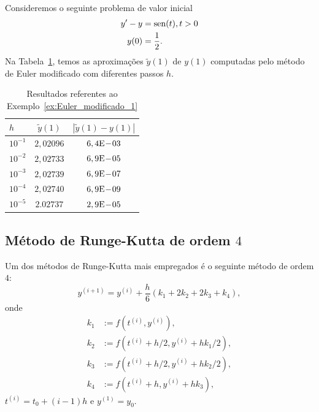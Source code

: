 \begin{ex}\label{ex:Euler_modificado_1}
  Consideremos o seguinte problema de valor inicial
  \begin{align}
    y' - y &= \operatorname{sen}(t), t>0\\
    y(0) &= \frac{1}{2}.
  \end{align}
  Na Tabela~\ref{tab:ex_Euler_modificado_1}, temos as aproximações $\tilde{y}(1)$ de $y(1)$ computadas pelo método de Euler modificado com diferentes passos $h$.
 
  \begin{table}[h!]
    \centering
    \begin{tabular}{l|cc}
      $h$ & $\tilde{y}(1)$ & $|\tilde{y}(1)-y(1)|$\\\hline
      $10^{-1}$ & $2,02096$ & $6,4\mathrm{E}\!-\!03$ \\
      $10^{-2}$ & $2,02733$ & $6,9\mathrm{E}\!-\!05$ \\
      $10^{-3}$ & $2,02739$ & $6,9\mathrm{E}\!-\!07$ \\
      $10^{-4}$ & $2,02740$ & $6,9\mathrm{E}\!-\!09$ \\
      $10^{-5}$ & $2.02737$ & $2,9\mathrm{E}\!-\!05$ \\\hline
    \end{tabular}
    \caption{Resultados referentes ao Exemplo~\ref{ex:Euler_modificado_1}}
    \label{tab:ex_Euler_modificado_1}
  \end{table}





\end{ex}

\subsection{Método de Runge-Kutta de ordem $4$}

Um dos métodos de Runge-Kutta mais empregados é o seguinte método de ordem $4$:
\begin{equation}
  y^{(i+1)} = y^{(i)} + \frac{h}{6}(k_1 + 2k_2 + 2k_3 + k_4),
\end{equation}
onde
\begin{align}
  k_1 &:= f(t^{(i)},y^{(i)}),\\
  k_2 &:= f(t^{(i)}+h/2,y^{(i)}+hk_1/2),\\
  k_3 &:= f(t^{(i)}+h/2,y^{(i)}+hk_2/2),\\
  k_4 &:= f(t^{(i)}+h,y^{(i)}+hk_3),
\end{align}
$t^{(i)}=t_0+(i-1)h$ e $y^{(1)}=y_0$.


